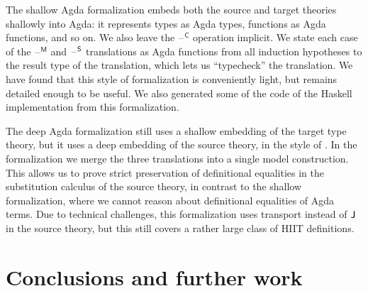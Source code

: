 \documentclass[dvipsnames]{lmcs} %
\newcommand{\blank}{\mathord{\hspace{1pt}\text{--}\hspace{1pt}}}
\newcommand{\C}{\mathsf{C}}
\newcommand{\M}{\mathsf{M}}
\newcommand{\1}{\mathsf{1}} \renewcommand{\Pr}{\mathsf{Pr}}
\theoremstyle{plain}\newtheorem{satz}[thm]{Satz} %
\begin{document}
The shallow Agda formalization embeds both the source and target theories
shallowly into Agda: it represents types as Agda types, functions as
Agda functions, and so on. We also leave the $\blank^\C$ operation
implicit. We state each case of the $\blank^\M$ and $\blank^\E$
translations as Agda functions from all induction hypotheses to the
result type of the translation, which lets us ``typecheck'' the
translation. We have found that this style of formalization is
conveniently light, but remains detailed enough to be useful. We also
generated some of the code of the Haskell implementation from this
formalization.

The deep Agda formalization still uses a shallow embedding of the
target type theory, but it uses a deep embedding of the source theory,
in the style of \cite{ttintt}. In the formalization we merge the three
translations into a single model construction. This allows us to prove
strict preservation of definitional equalities in the substitution
calculus of the source theory, in contrast to the shallow
formalization, where we cannot reason about definitional equalities of
Agda terms. Due to technical challenges, this formalization uses
transport instead of $\mathsf{J}$ in the source theory, but this still covers
a rather large class of HIIT definitions.


\section{Conclusions and further work}
\label{sec:summary}
\end{document}
